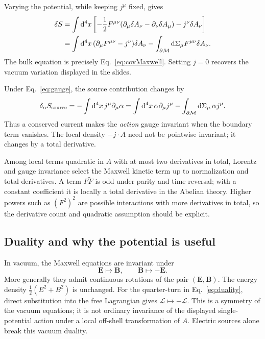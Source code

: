 \documentclass[11pt]{article}
\newcommand{\dd}{\mathrm{d}}
\newcommand{\Lag}{\mathcal{L}}
\newcommand{\cM}{\mathcal{M}}
\begin{document}
Varying the potential, while keeping \(j^\mu\) fixed, gives
\begin{align}
\delta S
&=\int\dd^4x\left[-\frac12F^{\mu\nu}
(\partial_\mu\delta A_\nu-\partial_\nu\delta A_\mu)
-j^\nu\delta A_\nu\right]\notag\\
&=\int\dd^4x\,(\partial_\mu F^{\mu\nu}-j^\nu)\delta A_\nu
-\int_{\partial\cM}\dd\Sigma_\mu F^{\mu\nu}\delta A_\nu.
\end{align}
The bulk equation is precisely Eq.~\eqref{eq:covMaxwell}. Setting \(j=0\)
recovers the vacuum variation displayed in the slides.

Under Eq.~\eqref{eq:gauge}, the source contribution changes by
\begin{equation}
\delta_\alpha S_{\rm source}
=-\int\dd^4x\,j^\mu\partial_\mu\alpha
=\int\dd^4x\,\alpha\partial_\mu j^\mu
-\int_{\partial\cM}\dd\Sigma_\mu\,\alpha j^\mu.
\label{eq:sourceGauge}
\end{equation}
Thus a conserved current makes the \emph{action} gauge invariant when the
boundary term vanishes. The local density \(-j\cdot A\) need not be
pointwise invariant; it changes by a total derivative.

Among local terms quadratic in \(A\) with at most two derivatives in total,
Lorentz and gauge invariance select the Maxwell kinetic term up to
normalization and total derivatives. A term \(F\widetilde F\) is odd under
parity and time reversal; with a constant coefficient it is locally a total
derivative in the Abelian theory. Higher powers such as \((F^2)^2\) are
possible interactions with more derivatives in total, so the derivative
count and quadratic assumption should be explicit.

\subsection{Duality and why the potential is useful}

In vacuum, the Maxwell equations are invariant under
\begin{equation}
\bm E\longmapsto\bm B,\qquad
\bm B\longmapsto-\bm E.
\label{eq:duality}
\end{equation}
More generally they admit continuous rotations of the pair \((\bm E,\bm B)\).
The energy density \(\tfrac12(E^2+B^2)\) is unchanged. For the quarter-turn
in Eq.~\eqref{eq:duality}, direct substitution into the free Lagrangian gives
\(\Lag\mapsto-\Lag\). This is a symmetry of the vacuum equations; it is
not ordinary invariance of the displayed single-potential action under a
local off-shell transformation of \(A\). Electric sources alone break this
vacuum duality.
\end{document}
